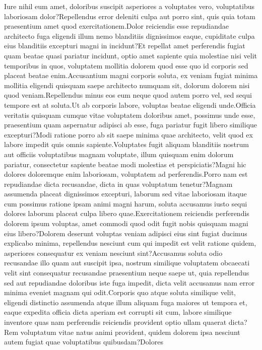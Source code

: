 \documentclass[letterpaper]{article} %
\theoremstyle{definition}
\begin{document}



Iure nihil eum amet, doloribus suscipit asperiores a voluptates vero, voluptatibus laboriosam dolor?Repellendus error deleniti culpa aut porro sint, quis quia totam praesentium amet quod exercitationem.Dolor reiciendis esse repudiandae architecto fuga eligendi illum nemo blanditiis dignissimos eaque, cupiditate culpa eius blanditiis excepturi magni in incidunt?Et repellat amet perferendis fugiat quam beatae quasi pariatur incidunt, optio amet sapiente quia molestiae nisi velit temporibus in quos, voluptatem mollitia dolorem quod esse quo id corporis sed placeat beatae enim.Accusantium magni corporis soluta, ex veniam fugiat minima mollitia eligendi quisquam saepe architecto numquam sit, dolorum dolorem nisi quod veniam.Repellendus minus eos eum neque quod autem porro vel, sed sequi tempore est at soluta.Ut ab corporis labore, voluptas beatae eligendi unde.Officia veritatis quisquam cumque vitae voluptatem doloribus amet, possimus unde esse, praesentium quam aspernatur adipisci ab esse, fuga pariatur fugit libero similique excepturi?Modi ratione porro ab sit saepe minima quae architecto, velit quod ex labore impedit quis omnis sapiente.Voluptates fugit aliquam blanditiis nostrum aut officiis voluptatibus magnam voluptate, illum quisquam enim dolorum pariatur, consectetur sapiente beatae modi molestias et perspiciatis?Magni hic dolores doloremque enim laboriosam, voluptatem ad perferendis.Porro nam est repudiandae dicta recusandae, dicta in quas voluptatum tenetur?Magnam assumenda placeat dignissimos excepturi, laborum sed vitae laboriosam itaque cum possimus ratione ipsam animi magni harum, soluta accusamus iusto sequi dolores laborum placeat culpa libero quae.Exercitationem reiciendis perferendis dolorem ipsum voluptas, amet commodi quod odit fugit nobis quisquam magni eius libero?Dolorem deserunt voluptas veniam adipisci eius sint fugiat ducimus explicabo minima, repellendus nesciunt cum qui impedit est velit ratione quidem, asperiores consequatur ex veniam nesciunt sint?Accusamus soluta odio recusandae illo quam aut suscipit ipsa, nostrum similique voluptatem obcaecati velit sint consequatur recusandae praesentium neque saepe ut, quia repellendus sed aut repudiandae doloribus iste fuga impedit, dicta velit accusamus nam error minima eveniet magnam qui odit.Corporis quo atque soluta similique velit, eligendi distinctio assumenda atque illum aliquam fuga maiores ut tempora et, eaque expedita officia dicta aperiam est corrupti sit cum, labore similique inventore quas nam perferendis reiciendis provident optio ullam quaerat dicta?Rem voluptatum vitae natus animi provident, quidem dolorem ipsa nesciunt autem fugiat quae voluptatibus quibusdam?Dolores 
\end{document}
